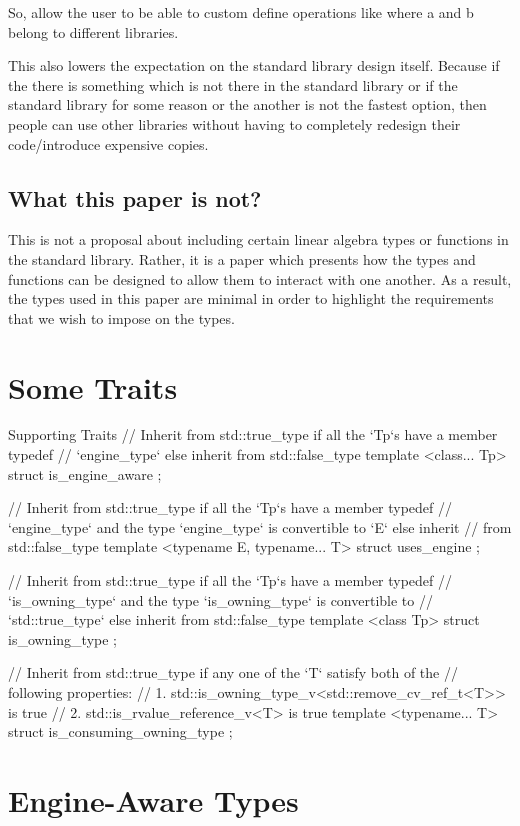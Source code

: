 \documentclass[oneside,11pt,a4paper]{jbarticle}
\begin{document}
So, allow the user to be able to custom define operations like 
where a and b belong to different libraries.

This also lowers the expectation on the standard library design itself. Because
if the there is something which is not there in the standard library or if the
standard library for some reason or the another is not the fastest option, then
people can use other libraries without having to completely redesign their
code/introduce expensive copies.

\subsection{What this paper is not?}
This is not a proposal about including certain linear algebra types or functions
in the standard library. Rather, it is a paper which presents how the types and
functions can be designed to allow them to interact with one another. As a
result, the types used in this paper are minimal in order to highlight the
requirements that we wish to impose on the types.

\section{Some Traits}
\begin{codecpp}{Supporting Traits}
// Inherit from std::true_type if all the `Tp`s have a member typedef
// `engine_type` else inherit from std::false_type
template <class... Tp>
struct is_engine_aware {
};

// Inherit from std::true_type if all the `Tp`s have a member typedef
// `engine_type` and the type `engine_type` is convertible to `E` else inherit
// from std::false_type
template <typename E, typename... T>
struct uses_engine {
};


// Inherit from std::true_type if all the `Tp`s have a member typedef
// `is_owning_type` and the type `is_owning_type` is convertible to
// `std::true_type` else inherit from std::false_type
template <class Tp>
struct is_owning_type {
};

// Inherit from std::true_type if any one of the `T` satisfy both of the
// following properties:
// 1. std::is_owning_type_v<std::remove_cv_ref_t<T>> is true
// 2. std::is_rvalue_reference_v<T> is true
template <typename... T>
struct is_consuming_owning_type {
};
\end{codecpp}



\section{Engine-Aware Types}
\end{document}
